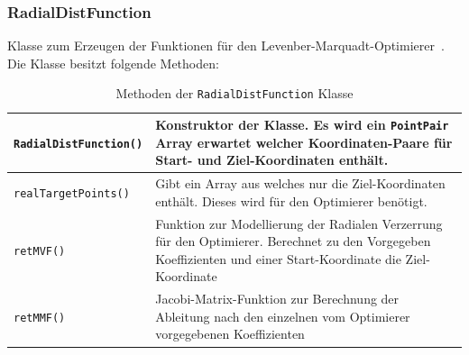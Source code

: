 \subsubsection{RadialDistFunction}
Klasse zum Erzeugen der Funktionen für den Levenber-Marquadt-Optimierer~\cite{optimizer_example}. Die Klasse besitzt folgende Methoden:

\begin{table}[H]
	\begin{tabular}{|p{} | p{}|} 
		\hline
		\texttt{RadialDistFunction()} & Konstruktor der Klasse. Es wird ein \texttt{PointPair} Array erwartet welcher Koordinaten-Paare für Start- und Ziel-Koordinaten enthält.\\ \hline
		\texttt{realTargetPoints()} & Gibt ein Array aus welches nur die Ziel-Koordinaten enthält. Dieses wird für den Optimierer benötigt.\\ \hline
		\texttt{retMVF()} & Funktion zur Modellierung der Radialen Verzerrung für den Optimierer. Berechnet zu den Vorgegeben Koeffizienten und einer Start-Koordinate die Ziel-Koordinate\\ \hline
		\texttt{retMMF()} & Jacobi-Matrix-Funktion zur Berechnung der Ableitung nach den einzelnen vom Optimierer vorgegebenen Koeffizienten \\ 
		\hline
	\end{tabular}
	\caption{Methoden der \texttt{RadialDistFunction} Klasse}
\end{table}

